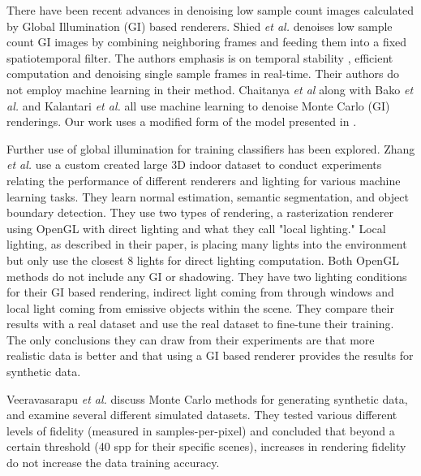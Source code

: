 \documentclass[10pt,twocolumn,letterpaper]{article}
\begin{document}
There have been recent advances in denoising low sample count images calculated by Global Illumination (GI) based renderers.
Shied \textit{et al.} \cite{Schied:2017:SVF:3105762.3105770} denoises low sample count GI images by combining neighboring frames and feeding them into a fixed spatiotemporal filter.  The authors emphasis is on temporal stability , efficient computation and denoising single sample frames in real-time. Their authors do not employ machine learning in their method. 
Chaitanya \textit{et al} \cite{Chaitanya:2017:IRM:3072959.3073601} along with 
Bako \textit{et al.} \cite{Bako17} and 
Kalantari \textit{et al.} \cite{Kalantari:2015:MLA:2809654.2766977} all use machine learning to denoise Monte Carlo (GI) renderings.  Our work uses a modified form of the model presented in \cite{Chaitanya:2017:IRM:3072959.3073601}.

Further use of global illumination for training classifiers has been explored.
Zhang \textit{et al.} \cite{DBLP:journals/corr/ZhangSYSLJF16} use a custom created large 3D indoor dataset to conduct experiments relating the performance of different renderers and lighting for various machine learning tasks. They learn normal estimation, semantic segmentation, and object boundary detection.  They use two types of rendering, a rasterization renderer using OpenGL with direct lighting and what they call "local lighting." Local lighting, as described in their paper, is placing many lights into the environment but only use the closest 8 lights for direct lighting computation.  Both OpenGL methods do not include any GI or shadowing. They have two lighting conditions for their GI based rendering,  indirect light coming from through windows and local light coming from emissive objects within the scene.  They compare their results with a real dataset and use the real dataset to fine-tune their training. The only conclusions they can draw from their experiments are that more realistic data is better and that using a GI based renderer provides the results for synthetic data.


Veeravasarapu \textit{et al.} \cite{DBLP:journals/corr/VeeravasarapuRR16} discuss Monte Carlo methods for generating synthetic data, and examine several different simulated datasets. They tested various different levels of fidelity (measured in samples-per-pixel) and concluded that beyond a certain threshold (40 spp for their specific scenes), increases in rendering fidelity do not increase the data training accuracy.
\end{document}
